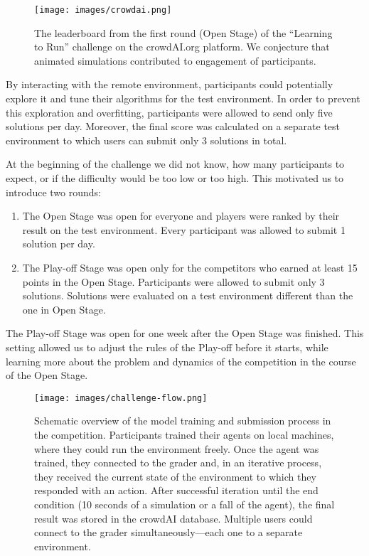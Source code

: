 \documentclass[graybox]{svmult}
\begin{document}
\begin{figure}[ht!]
  \centering
  \texttt{[image: images/crowdai.png]}
  \caption{The leaderboard from the first round (Open Stage) of the ``Learning to Run'' challenge on the crowdAI.org platform. We conjecture that animated simulations contributed to engagement of participants.}
  \label{fig:crowdai}
\end{figure}

By interacting with the remote environment, participants could potentially explore it and tune their algorithms for the test environment. In order to prevent this exploration and overfitting, participants were allowed to send only five solutions per day. Moreover, the final score was calculated on a separate test environment to which users can submit only 3 solutions in total.

At the beginning of the challenge we did not know, how many participants to expect, or if the difficulty would be too low or too high. This motivated us to introduce two rounds:
\begin{enumerate}
\item The Open Stage was open for everyone and players were ranked by their result on the test environment. Every participant was allowed to submit 1 solution per day.
\item The Play-off Stage was open only for the competitors who earned at least 15 points in the Open Stage. Participants were allowed to submit only 3 solutions. Solutions were evaluated on a test environment different than the one in Open Stage.
\end{enumerate}
The Play-off Stage was open for one week after the Open Stage was finished. This setting allowed us to adjust the rules of the Play-off before it starts, while learning more about the problem and dynamics of the competition in the course of the Open Stage.

\begin{figure}[ht!]
  \centering
  \texttt{[image: images/challenge-flow.png]}
  \caption{Schematic overview of the model training and submission process in the competition. Participants trained their agents on local machines, where they could run the environment freely. Once the agent was trained, they connected to the grader and, in an iterative process, they received the current state of the environment to which they responded with an action. After successful iteration until the end condition (10 seconds of a simulation or a fall of the agent), the final result was stored in the crowdAI database. Multiple users could connect to the grader simultaneously---each one to a separate environment. }
  \label{fig:flow}
\end{figure}
\end{document}
